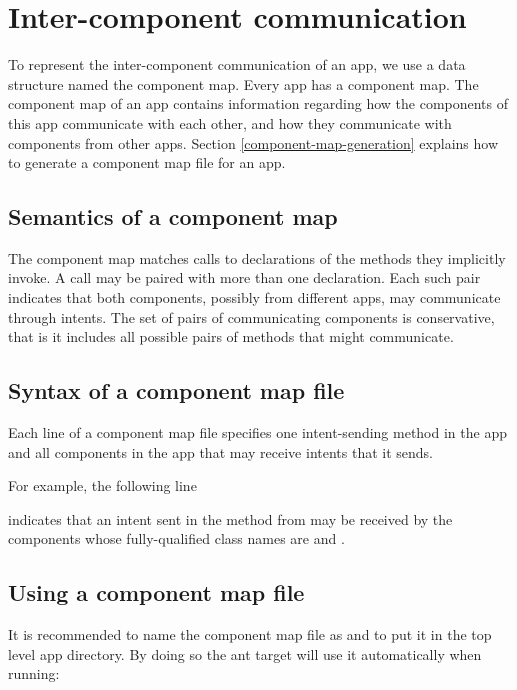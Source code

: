 \section{Inter-component communication\label{component-map}}

To represent the inter-component communication of an app, we use a data
structure named the component map. Every app has a component map. The component map
of an app contains information regarding how the components of this app
communicate with each other, and how they communicate with components from other
apps. Section \ref{component-map-generation} explains how to generate a
component map file for an app.

\subsection{Semantics of a component map}
The component map matches \sendIntent{} calls to
declarations of the \onReceive{} methods they implicitly invoke. A \sendIntent{}
call may be paired with more than one \onReceive{} declaration. Each such pair
indicates that both components, possibly from different apps, may communicate
through intents. The set of pairs of communicating components is conservative,
that is it includes all possible pairs of methods that might communicate.

\subsection{Syntax of a component map file}
Each line of a component map file specifies one intent-sending method in the app
and all components in the app that may receive intents that it sends.

For example, the following line


\noindent
indicates that an intent sent in the method  from 
 may be received by the components whose fully-qualified class 
names are  and .

\subsection{Using a component map file}
It is recommended to name the component map file as  and to
put it in the top level app directory. By doing so the ant target will use it
automatically when running:

